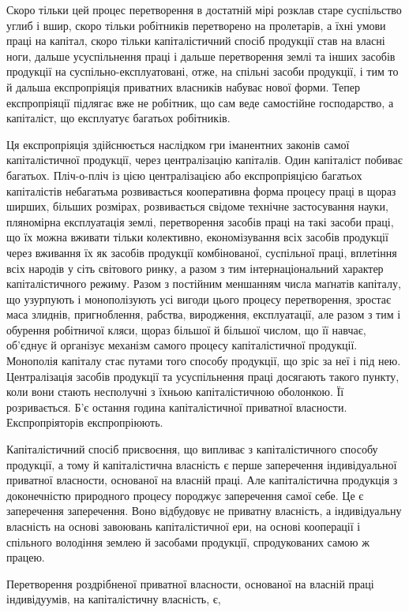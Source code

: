 Скоро тільки цей процес перетворення в достатній мірі розклав
старе суспільство углиб і вшир, скоро тільки робітників
перетворено на пролетарів, а їхні умови праці на капітал, скоро
тільки капіталістичний спосіб продукції став на власні ноги,
дальше усуспільнення праці і дальше перетворення землі та
інших засобів продукції на суспільно-експлуатовані, отже, на
спільні засоби продукції, і тим то й дальша експропріяція приватних
власників набуває нової форми. Тепер експропріяції
підлягає вже не робітник, що сам веде самостійне господарство,
а капіталіст, що експлуатує багатьох робітників.

Ця експропріяція здійснюється наслідком гри іманентних законів
самої капіталістичної продукції, через централізацію капіталів.
Один капіталіст побиває багатьох. Пліч-о-пліч із цією
централізацією або експропріяцією багатьох капіталістів небагатьма
розвивається кооперативна форма процесу праці в
щораз ширших, більших розмірах, розвивається свідоме технічне
застосування науки, пляномірна експлуатація землі, перетворення
засобів праці на такі засоби праці, що їх можна
вживати тільки колективно, економізування всіх засобів продукції
через вживання їх як засобів продукції комбінованої,
суспільної праці, вплетіння всіх народів у сіть світового ринку,
а разом з тим інтернаціональний характер капіталістичного режиму.
Разом з постійним меншанням числа маґнатів капіталу,
що узурпують і монополізують усі вигоди цього процесу перетворення,
зростає маса злиднів, пригноблення, рабства, виродження,
експлуатації, але разом з тим і обурення робітничої
кляси, щораз більшої й більшої числом, що її навчає, об’єднує
й організує механізм самого процесу капіталістичної продукції.
Монополія капіталу стає путами того способу продукції, що
зріс за неї і під нею. Централізація засобів продукції та усуспільнення
праці досягають такого пункту, коли вони стають
несполучні з їхньою капіталістичною оболонкою. Її розривається.
Б’є остання година капіталістичної приватної власности.
Експропріяторів експропріюють.

Капіталістичний спосіб присвоєння, що випливає з капіталістичного
спо\-собу продукції, а тому й капіталістична власність
є перше заперечення індивідуальної приватної власности, основаної
на власній праці. Але капіталістична продукція з доконечністю
природного процесу породжує заперечення самої себе.
Це є заперечення заперечення. Воно відбудовує не приватну
власність, а індивідуальну власність на основі завоювань капіталістичної
ери, на основі кооперації і спільного володіння землею
й засобами продукції, спродукованих самою ж працею.

Перетворення роздрібненої приватної власности, основаної
на власній праці індивідуумів, на капіталістичну власність, є,
\parbreak{}  %
